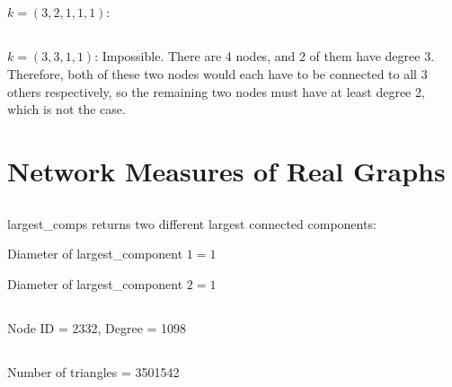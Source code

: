 \documentclass {article}
\begin{document}
\subsection{}
$ k = (3, 2, 1, 1, 1) $:
\begin{figure}[H]
\end{figure}

\subsection{}
$ k = (3, 3, 1, 1) $:
Impossible. There are 4 nodes, and 2 of them have degree 3. Therefore, both of these two nodes would each have to be connected to all 3 others respectively, so the remaining two nodes must have at least degree 2, which is not the case.

\newpage



\section{Network Measures of Real Graphs}
\subsection{}
largest\_comps returns two different largest connected components:

Diameter of largest\_component $ 1 = 1 $

Diameter of largest\_component $ 2 = 1 $

\subsection{}
Node ID = 2332,	 Degree = 1098

\subsection{}
Number of triangles = 3501542
\end{document}
